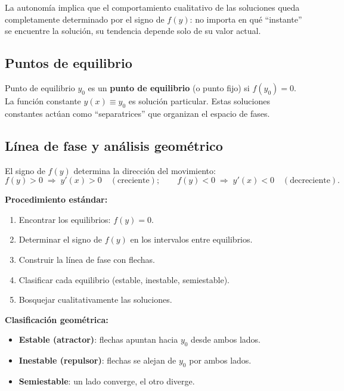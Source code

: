 \documentclass[11pt,letterpaper]{article}
\begin{document}
La autonomía implica que el comportamiento cualitativo de las soluciones queda
completamente determinado por el signo de $f(y)$: no importa en qué ``instante''
se encuentre la solución, su tendencia depende solo de su valor actual.

\subsection{Puntos de equilibrio}

\begin{definicion}{Punto de equilibrio}{}
$y_0$ es un \textbf{punto de equilibrio} (o punto fijo) si $f(y_0)=0$.
La función constante $y(x)\equiv y_0$ es solución particular. Estas soluciones
constantes actúan como ``separatrices'' que organizan el espacio de fases.
\end{definicion}

\subsection{Línea de fase y análisis geométrico}

El signo de $f(y)$ determina la dirección del movimiento:
\[
f(y)>0\;\Rightarrow\; y'(x)>0\quad(\text{creciente});\qquad
f(y)<0\;\Rightarrow\; y'(x)<0\quad(\text{decreciente}).
\]

\textbf{Procedimiento estándar:}
\begin{enumerate}
    \item Encontrar los equilibrios: $f(y)=0$.
    \item Determinar el signo de $f(y)$ en los intervalos entre equilibrios.
    \item Construir la línea de fase con flechas.
    \item Clasificar cada equilibrio (estable, inestable, semiestable).
    \item Bosquejar cualitativamente las soluciones.
\end{enumerate}

\textbf{Clasificación geométrica:}
\begin{itemize}
    \item \textbf{Estable (atractor)}: flechas apuntan hacia $y_0$ desde ambos lados.
    \item \textbf{Inestable (repulsor)}: flechas se alejan de $y_0$ por ambos lados.
    \item \textbf{Semiestable}: un lado converge, el otro diverge.
\end{itemize}
\end{document}
